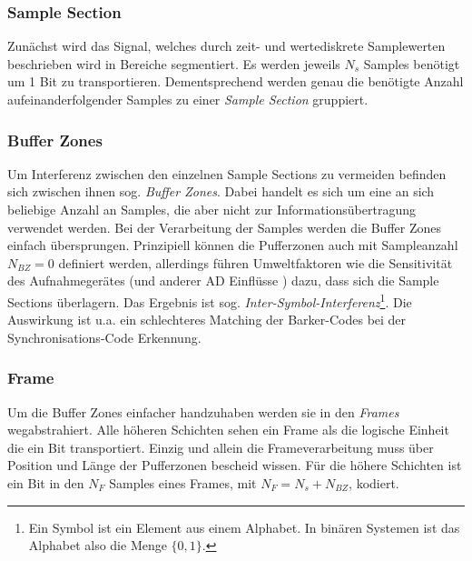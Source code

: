 \subsubsection{Sample Section}

Zunächst wird das Signal, welches durch zeit- und wertediskrete Samplewerten beschrieben wird in Bereiche segmentiert. Es werden jeweils $N_s$ Samples benötigt um 1 Bit zu transportieren. Dementsprechend werden genau die benötigte Anzahl aufeinanderfolgender Samples zu einer \textit{Sample Section} gruppiert.  

\subsubsection{Buffer Zones}

Um Interferenz zwischen den einzelnen Sample Sections zu vermeiden befinden sich zwischen ihnen sog. \textit{Buffer Zones}. Dabei handelt es sich um eine an sich beliebige Anzahl an Samples, die aber nicht zur Informationsübertragung verwendet werden. Bei der Verarbeitung der Samples werden die Buffer Zones einfach übersprungen. Prinzipiell können die Pufferzonen auch mit Sampleanzahl ${N}_{BZ} = 0$ definiert werden, allerdings führen Umweltfaktoren wie die Sensitivität des Aufnahmegerätes (und anderer AD Einflüsse ) dazu, dass sich die Sample Sections überlagern\cite{chang2012location}. Das Ergebnis ist sog. \textit{Inter-Symbol-Interferenz}\footnote{Ein Symbol ist ein Element aus einem Alphabet. In binären Systemen ist das Alphabet also die Menge $\{0,1\}$.}. Die Auswirkung ist u.a. ein schlechteres Matching der Barker-Codes bei der Synchronisations-Code Erkennung.

\subsubsection{Frame}

Um die Buffer Zones einfacher handzuhaben werden sie in den \textit{Frames} wegabstrahiert. Alle höheren Schichten sehen ein Frame als die logische Einheit die ein Bit transportiert. Einzig und allein die Frameverarbeitung muss über Position und Länge der Pufferzonen bescheid wissen. Für die höhere Schichten ist ein Bit in den ${N}_{F}$ Samples eines Frames, mit ${N}_{F} = {N}_{s} + {N}_{BZ}$, kodiert.

